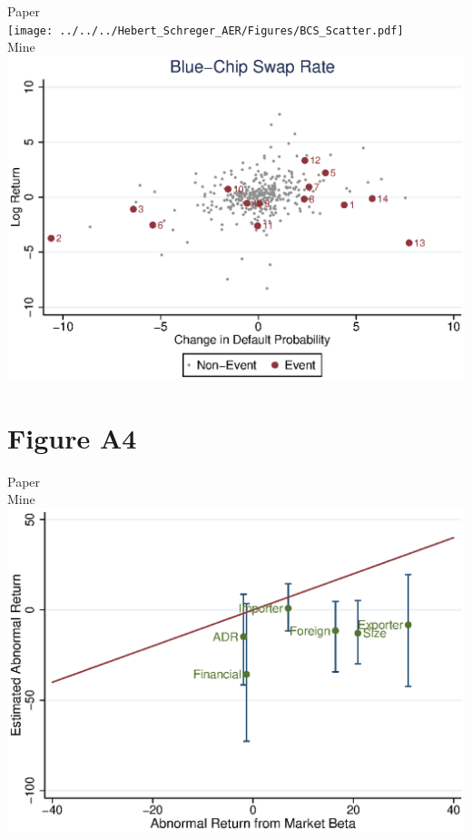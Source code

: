 \documentclass{article}
\begin{document}
\newpage Paper \\
\texttt{[image: ../../../Hebert\_Schreger\_AER/Figures/BCS\_Scatter.pdf]}\\
Mine \\
\includegraphics[scale = .8]{BCS_Scatter.eps}\\

\newpage
\section{Figure A4}
Paper \\
Mine \\
\includegraphics[scale = .8]{BK_HML_All2.eps}\\
\end{document}
